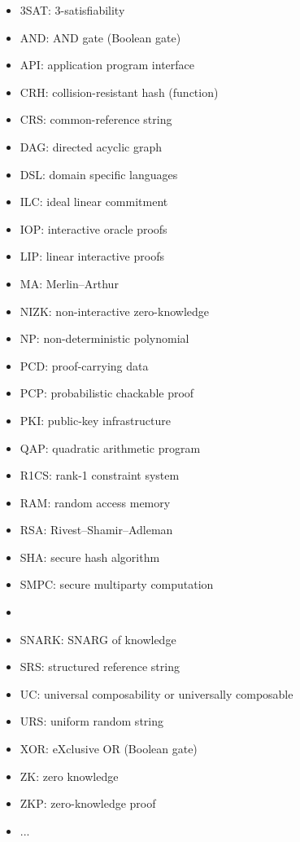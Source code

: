 \begin{multicols}{2}
\begin{itemize}
\item 3SAT: 3-satisfiability
\item AND: AND gate (Boolean gate)
\item API: application program interface
\item CRH: collision-resistant hash (function)
\item CRS: common-reference string
\item DAG: directed acyclic graph
\item DSL: domain specific languages
\item ILC: ideal linear commitment
\item IOP: interactive oracle proofs
\item LIP: linear interactive proofs
\item MA: Merlin--Arthur
\item NIZK: non-interactive zero-knowledge
\item NP: non-deterministic polynomial
\item PCD: proof-carrying data
\item PCP: probabilistic chackable proof
\item PKI: public-key infrastructure
\item QAP: quadratic arithmetic program
\item R1CS: rank-1 constraint system
\item RAM: random access memory 
\item RSA: Rivest--Shamir--Adleman
\item SHA: secure hash algorithm
\item SMPC: secure multiparty computation
\item {}
\item SNARK: SNARG of knowledge
\item SRS: structured reference string
\item UC: universal composability or universally composable
\item URS: uniform random string
\item XOR: eXclusive OR (Boolean gate)
\item ZK: zero knowledge
\item ZKP: zero-knowledge proof
\item ...
\end{itemize}
\end{multicols}


